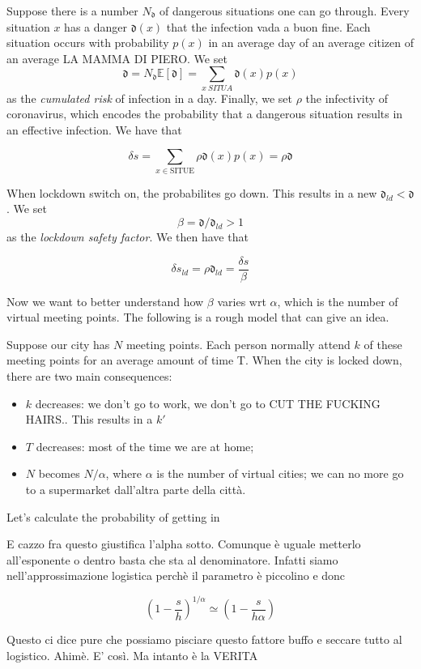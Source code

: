 \documentclass{article}
\theoremstyle{definition}
\theoremstyle{plain}
\theoremstyle{plain}
\newcommand{\dang}{\mathfrak{d}}
\newcommand{\exv}[1]{\mathbb{E}[#1]}
\begin{document}
Suppose there is a number $N_{\dang}$ of dangerous situations one can go through. Every situation $x$ has a danger $\dang(x)$ that the infection vada a buon fine. Each situation occurs with probability $p(x)$ in an average day of an average citizen of an average LA MAMMA DI PIERO. We set
$$ \dang = N_{\dang} \exv{\dang} = \sum_{x\  SITUA} \dang(x) p(x)  $$
as the \textit{cumulated risk} of infection in a day.
Finally, we set $\rho$ the infectivity of coronavirus, which encodes the probability that a dangerous situation results in an effective infection. We have that 

$$ \delta s = \sum_{x \in \text{SITUE} } \rho \dang(x) p(x) = \rho \dang  $$

When lockdown switch on, the probabilites go down. This results in a new $\dang_{ld} < \dang$. We set $$\beta = \dang / \dang_{ld} > 1 $$
as the \textit{lockdown safety factor}. We then have that

$$ \delta s_{ld} = \rho \dang_{ld} = \frac{\delta s}{\beta} $$

Now we want to better understand how $\beta$ varies wrt $\alpha$, which is the number of virtual meeting points. The following is a rough model that can give an idea. \newline

Suppose our city has $N$ meeting points. Each person normally attend $k$ of these meeting points for an average amount of time T. When the city is locked down, there are two main consequences:
\begin{itemize}
    \item $k$ decreases: we don't go to work, we don't go to CUT THE FUCKING HAIRS.. This results in a $k'$
    \item $T$ decreases: most of the time we are at home;
    \item $N$ becomes $N/\alpha$, where $\alpha$ is the number of virtual cities; we can no more go to a supermarket dall'altra parte della città.
\end{itemize}

Let's calculate the probability of getting in 

E cazzo fra questo giustifica l'alpha sotto. Comunque è uguale metterlo all'esponente o dentro basta che sta al denominatore. Infatti siamo nell'approssimazione logistica perchè il parametro è piccolino e donc

$$ \left ( 1- \frac{s}{h} \right )^{1/\alpha} \simeq  \left (1- \frac{s}{h \alpha} \right ) $$

Questo ci dice pure che possiamo pisciare questo fattore buffo e seccare tutto al logistico. Ahimè. E' così. Ma intanto è la VERITA
\end{document}

